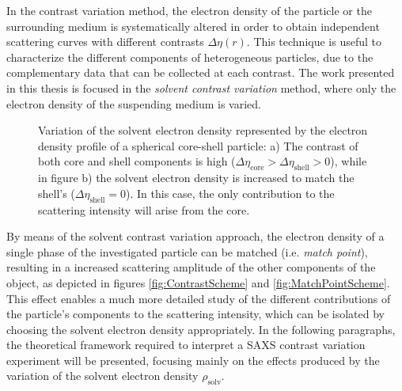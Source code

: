 In the contrast variation method, the electron density of the particle or the surrounding medium is systematically altered in order to obtain independent scattering curves with different contrasts $\Delta \eta (r)$. This technique is useful to characterize the different components of heterogeneous particles, due to the complementary data that can be collected at each contrast. The work presented in this thesis is focused in the \emph{solvent contrast variation} method, where only the electron density of the suspending medium is varied.

\begin{figure}%
	\centering
		\qquad
	\caption[Solvent contrast variation experiment and contrast matching scheme.]{Variation of the solvent electron density represented by the electron density profile of a spherical core-shell particle: a) The contrast of both core and shell components is high ($\Delta\eta_{\text{core}} > \Delta\eta_{\text{shell}} > 0$), while in figure b) the solvent electron density is increased to match the shell's ($\Delta\eta_{\text{shell}} = 0$). In this case, the only contribution to the scattering intensity will arise from the core.}
\end{figure}


By means of the solvent contrast variation approach, the electron density of a single phase of the investigated particle can be matched (i.e. \emph{match point}), resulting in a increased scattering amplitude of the other components of the object, as depicted in figures \ref{fig:ContrastScheme} and \ref{fig:MatchPointScheme}. This effect enables a much more detailed study of the different contributions of the particle's components to the scattering intensity, which can be isolated by choosing the solvent electron density appropriately. In the following paragraphs, the theoretical framework required to interpret a SAXS contrast variation experiment will be presented, focusing mainly on the effects produced by the variation of the solvent electron density $\rho_{\text{solv}}$.

 
